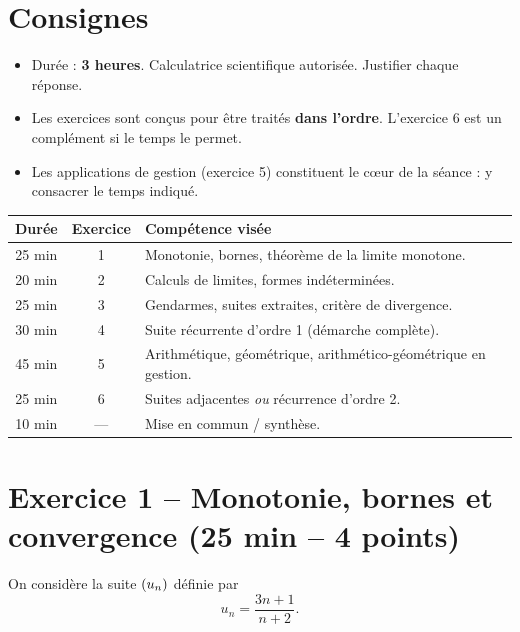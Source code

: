 \documentclass[11pt,a4paper]{article}
\begin{document}

\section*{Consignes}

\begin{itemize}
  \item Durée : \textbf{3 heures}. Calculatrice scientifique autorisée. Justifier chaque réponse.
  \item Les exercices sont conçus pour être traités \textbf{dans l'ordre}. L'exercice 6 est un complément si le temps le permet.
  \item Les applications de gestion (exercice 5) constituent le cœur de la séance : y consacrer le temps indiqué.
\end{itemize}

\begin{planbox}
\renewcommand{\arraystretch}{1.15}
\begin{tabularx}{\textwidth}{@{}c c X@{}}
\toprule
\textbf{Durée} & \textbf{Exercice} & \textbf{Compétence visée} \\
\midrule
25 min & 1 & Monotonie, bornes, théorème de la limite monotone. \\
20 min & 2 & Calculs de limites, formes indéterminées. \\
25 min & 3 & Gendarmes, suites extraites, critère de divergence. \\
30 min & 4 & Suite récurrente d'ordre 1 (démarche complète). \\
45 min & 5 & Arithmétique, géométrique, arithmético-géométrique en gestion. \\
25 min & 6 & Suites adjacentes \emph{ou} récurrence d'ordre 2. \\
10 min & --- & Mise en commun / synthèse. \\
\bottomrule
\end{tabularx}
\end{planbox}

\section*{Exercice 1 -- Monotonie, bornes et convergence \hfill {\normalsize\normalfont (25 min -- 4 points)}}

On considère la suite $(u_n)$ définie par
\[
u_n = \dfrac{3n+1}{n+2}.
\]
\end{document}
